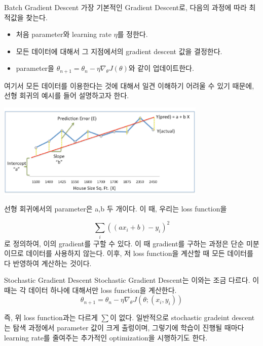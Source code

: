 \documentclass{beamer}
\begin{document}
\begin{frame}{Batch Gradient Descent}
가장 기본적인 Gradient Descent로, 다음의 과정에 따라 최적값을 찾는다. 

\begin{itemize} 
\item 처음 parameter와 learning rate $\eta$를 정한다. 
\item 모든 데이터에 대해서 그 지점에서의 gradient descent 값을 결정한다. 
\item parameter을 $\theta_{n+1} = \theta_n - \eta \nabla_{\theta} J(\theta)$와 같이 업데이트한다. 
\end{itemize}

\end{frame}

\begin{frame}

여기서 모든 데이터를 이용한다는 것에 대해서 일견 이해하기 어려울 수 있기 때문에, 선형 회귀의 예시를 들어 설명하고자 한다. 

\includegraphics[width=10cm,keepaspectratio]{err}

선형 회귀에서의 parameter은 a,b 두 개이다. 이 때, 우리는 loss function을 

\begin{equation} 
\sum_i ((ax_i + b) - y_i)^2 
\end{equation}
로 정의하여, 이의 gradient를 구할 수 있다. 이 때 gradient를 구하는 과정은 단순 미분이므로 데이터를 사용하지 않는다. 이후, 저 loss function을 계산할 때 모든 데이터를 다 반영하여 계산하는 것이다. 
\end{frame}

\begin{frame}{Stochastic Gradient Descent} 
Stochastic Gradient Descent는 이와는 조금 다르다. 이 때는 각 데이터 하나에 대해서만 loss function을 계산한다. 
\begin{equation}
\theta_{n+1} = \theta_n - \eta \nabla_{\theta} J(\theta;(x_i, y_i))
\end{equation}

즉, 위 loss function과는 다르게 $\sum$이 없다. 일반적으로 stochastic gradeint descent는 탐색 과정에서 parameter 값이 크게 출렁이며, 그렇기에 학습이 진행될 때마다 learning rate를 줄여주는 추가적인 optimization을 시행하기도 한다. 
\end{frame}
\end{document}
